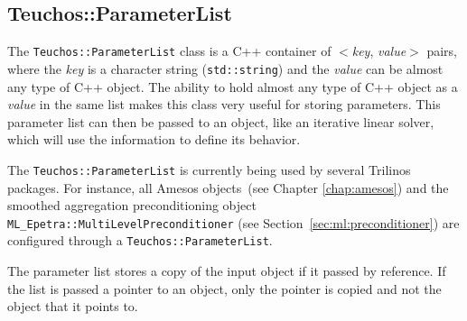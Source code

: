 \clearpage

\subsection{Teuchos::ParameterList}
\label{sec:teuchos:ParameterList}

The {\tt Teuchos::ParameterList} class is a C++ container of $<${\it key}, {\it value}$>$ pairs, 
where the {\it key} is a character string ({\tt std::string}) and the {\it value} can be almost 
any type of C++ object.  The ability to hold almost any type of C++ object as a {\it value} 
in the same list makes this class very useful for storing parameters.  This parameter list can then
be passed to an object, like an iterative linear solver, which will use the information to define 
its behavior. 

The \verb!Teuchos::ParameterList! is currently being used by several Trilinos
packages.  For instance, all Amesos objects~(see Chapter
\ref{chap:amesos}) and the smoothed aggregation preconditioning object
\verb!ML_Epetra::MultiLevelPreconditioner! (see Section~\ref{sec:ml:preconditioner}) 
are configured through a \verb!Teuchos::ParameterList!.

\begin{remark}
The parameter list stores a copy of the input object if it passed by reference.  
If the list is passed a pointer to an object, only the pointer is copied and
not the object that it points to. 
\end{remark}

